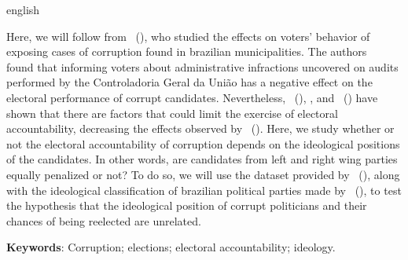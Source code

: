 \documentclass[
	12pt,				%
	openright,			%
	twoside,			%
	a4paper,			%
	openany,
	english,			%
	brazil				%
	]{abntex2}
\newcommand{\listofquadrosname}{Lista de quadros}
\begin{document}
\begin{resumo}[Abstract]
	
	\begin{otherlanguage*}{english}
		
Here, we will follow from ~(\citeyear{ferraz2008exposing}), who studied the effects on voters' behavior of exposing cases of corruption found in brazilian municipalities. The authors~\cite{ferraz2008exposing} found that informing voters about administrative infractions uncovered on audits performed by the Controladoria Geral da União has a negative effect on the electoral performance of corrupt candidates. Nevertheless, ~(\citeyear{Botero2021Apr}), \cite{dunning2019voter}, and ~(\citeyear{Boas2019Apr}) have shown that there are factors that could limit the exercise of electoral accountability, decreasing the effects observed by ~(\citeyear{ferraz2008exposing}). Here, we study whether or not the electoral accountability of corruption depends on the ideological positions of the candidates. In other words, are candidates from left and right wing parties equally penalized or not? To do so, we will use the dataset provided by ~(\citeyear{Brollo2013Aug}), along with the ideological classification of brazilian political parties made by ~(\citeyear{Bolognesi2022Sep}), to test the hypothesis that the ideological position of corrupt politicians and their chances of being reelected are unrelated.

\textbf{Keywords}: Corruption; elections; electoral accountability; ideology.
   
	\end{otherlanguage*}

\end{resumo}

\cleardoublepage

\pdfbookmark[0]{\listofquadrosname}{loq}
\cleardoublepage

\cleardoublepage


\end{document}

